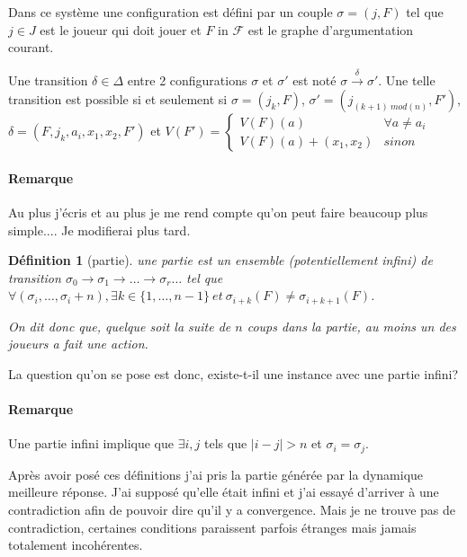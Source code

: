 \documentclass[12pt]{article}
\theoremstyle{defi}
\newtheorem{definition}{Définition}[section]
\theoremstyle{not}
\theoremstyle{prob}
\begin{document}
    Dans ce système une configuration est défini par un couple $\sigma =(j, F)$ tel que $j \in J$ est le joueur qui doit jouer et $F$ in $\mathcal{F}$ est le graphe d'argumentation courant.

    Une transition $\delta \in \Delta$ entre 2 configurations $\sigma$ et $\sigma'$ est noté $\sigma \overset{\delta}{\longrightarrow} \sigma'$. Une telle transition est possible si et seulement si $\sigma = (j_k, F)$, $\sigma' = (j_{(k+1)\ mod(n)}, F')$, $\delta = (F, j_k, a_i, x_1, x_2, F')$ et $V(F') = \left\lbrace \begin{array}{ll} V(F)(a) & \forall a \neq a_i \\ V(F)(a) + (x_1, x_2) & sinon \end{array} \right.$

    \paragraph{Remarque} Au plus j'écris et au plus je me rend compte qu'on peut faire beaucoup plus simple.... Je modifierai plus tard.

    \begin{definition}[partie]
      une partie est un ensemble (potentiellement infini) de transition $\sigma_0 \longrightarrow \sigma_1 \longrightarrow \ldots \longrightarrow \sigma_r \ldots$
      tel que
      $\forall (\sigma_i, \ldots, \sigma_i+n), \exists k \in \{1, \ldots, n-1\}\ et\ \sigma_{i+k}(F) \neq \sigma_{i+k+1}(F)$.

      On dit donc que, quelque soit la suite de $n$ coups dans la partie, au moins un des joueurs a fait une action.
  \end{definition}

  La question qu'on se pose est donc, existe-t-il une instance avec une partie infini?

  \paragraph{Remarque} Une partie infini implique que $\exists i, j$ tels que $|i - j| > n$ et $\sigma_i = \sigma_j$.

  Après avoir posé ces définitions j'ai pris la partie générée par la dynamique meilleure réponse. J'ai supposé qu'elle était infini et j'ai essayé d'arriver à une contradiction afin de pouvoir dire qu'il y a convergence. Mais je ne trouve pas de contradiction, certaines conditions paraissent parfois étranges mais jamais totalement incohérentes.
\end{document}
